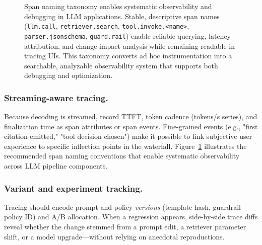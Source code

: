 \begin{figure}[t]
\begin{llmfigbox}
\end{llmfigbox}
\caption{Span naming taxonomy enables systematic observability and debugging in LLM applications. Stable, descriptive span names (\texttt{llm.call}, \texttt{retriever.search}, \texttt{tool.invoke.<name>}, \texttt{parser.jsonschema}, \texttt{guard.rail}) enable reliable querying, latency attribution, and change-impact analysis while remaining readable in tracing UIs. This taxonomy converts ad hoc instrumentation into a searchable, analyzable observability system that supports both debugging and optimization.}
\label{fig:ch05_span_taxonomy}
\end{figure}

\subsubsection{Streaming-aware tracing.}
Because decoding is streamed, record TTFT, token cadence (tokens/s series), and finalization time as span attributes or span events. Fine-grained events (e.g., "first citation emitted," "tool decision chosen") make it possible to link subjective user experience to specific inflection points in the waterfall. Figure~\ref{fig:ch05_span_taxonomy} illustrates the recommended span naming conventions that enable systematic observability across LLM pipeline components.

\subsubsection{Variant and experiment tracking.}
Tracing should encode prompt and policy \emph{versions} (template hash, guardrail policy ID) and A/B allocation. When a regression appears, side-by-side trace diffs reveal whether the change stemmed from a prompt edit, a retriever parameter shift, or a model upgrade—without relying on anecdotal reproductions.

